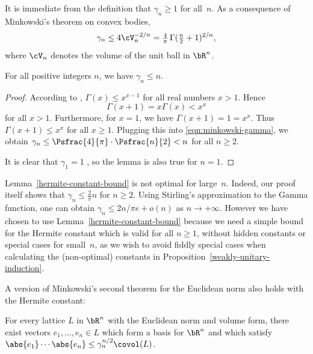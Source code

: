 It is immediate from the definition that $\gamma_n \geq 1$ for all~$n$.
As a consequence of Minkowski's theorem on convex bodies,
\begin{equation} \label{eqn:minkowski-gamma}
\gamma_n \leq 4 \cV_n^{-2/n} = \tfrac{4}{\pi}\, \Gamma(\tfrac{n}{2} + 1)^{2/n},
\end{equation}
where $\cV_n$ denotes the volume of the unit ball in $\bR^n$.

\begin{lemma} \label{hermite-constant-bound}
For all positive integers $n$, we have $\gamma_n \leq n$.
\end{lemma}

\begin{proof}
According to \cite[Th.\,1.5]{AQ97}, $\Gamma(x) \!\leq\! x^{x-1}$ for all real numbers $x\!>\!1$.
Hence
\[
\Gamma(x+1) = x\Gamma(x) < x^x
\]
for all $x > 1$.
Furthermore, for $x=1$, we have $\Gamma(x+1) = 1 = x^x$.
Thus $\Gamma(x+1) \leq x^x$ for all $x \geq 1$.
Plugging this into \eqref{eqn:minkowski-gamma}, we obtain $\gamma_n \leq \Psfrac{4}{\pi} \cdot \Psfrac{n}{2} < n$ for all $n \geq 2$.

It is clear that $\gamma_1=1$ \cite[App.]{cassels:geom-of-numbers}, so the lemma is also true for $n=1$.
\end{proof}

Lemma~\ref{hermite-constant-bound} is not optimal for large~$n$.
Indeed, our proof itself shows that $\gamma_n \leq \frac{2}{\pi}n$ for $n \geq 2$.
Using Stirling's approximation to the Gamma function, one can obtain $\gamma_n \leq 2n/\pi e + o(n)$ as $n \to +\infty$.
However we have chosen to use Lemma~\ref{hermite-constant-bound} because we need a simple bound for the Hermite constant which is valid for all $n \geq 1$, without hidden constants or special cases for small~$n$, as we wish to avoid fiddly special cases when calculating the (non-optimal) constants in Proposition~\ref{weakly-unitary-induction}.

A version of Minkowski's second theorem for the Euclidean norm also holds with the Hermite constant:

\begin{theorem} \label{minkowski-2nd}
For every lattice $L$ in $\bR^n$ with the Euclidean norm and volume form, there exist vectors $e_1, \dotsc, e_n \in L$ which form a basis for $\bR^n$ and which satisfy $\abs{e_1}\dotsm\abs{e_n} \leq \gamma_n^{n/2} \covol(L)$.
\end{theorem}

